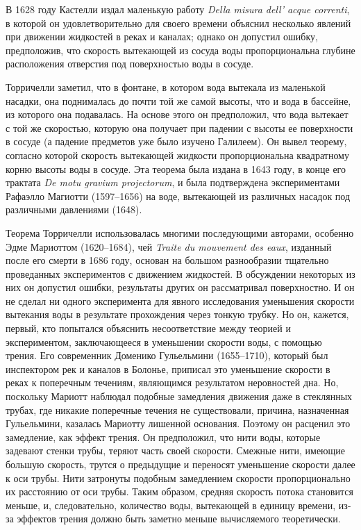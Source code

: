 В 1628 году Кастелли издал маленькую работу \textit{Della misura dell' acque correnti}, в которой он 
удовлетворительно для своего времени объяснил несколько явлений при движении жидкостей 
в реках и каналах; однако он допустил ошибку, предположив, что скорость вытекающей 
из сосуда воды пропорциональна глубине расположения отверстия под поверхностью воды в сосуде.

Торричелли заметил, что в фонтане, в котором вода вытекала из маленькой насадки, 
она поднималась до почти той же самой высоты, что и вода в бассейне, из которого она подавалась. 
На основе этого он предположил, что вода вытекает с той же скоростью, которую она получает 
при падении с высоты ее поверхности в сосуде (а падение предметов уже было изучено Галилеем). 
Он вывел теорему, согласно 
которой скорость вытекающей жидкости пропорциональна квадратному корню высоты воды в сосуде. 
Эта теорема была издана в 1643 году, в конце его трактата \textit{De motu gravium projectorum}, и была 
подтверждена экспериментами Рафаэлло Магиотти (1597--1656) на воде, вытекающей из различных 
насадок под различными давлениями (1648).

Теорема Торричелли использовалась многими последующими авторами, особенно 
Эдме Мариоттом (1620--1684), чей \textit{Traite du mouvement des eaux}, изданный после его смерти 
в 1686 году, основан на большом разнообразии тщательно проведанных экспериментов 
с движением жидкостей. В обсуждении некоторых из них он допустил ошибки, результаты 
других он рассматривал поверхностно. И он не сделал ни одного эксперимента для явного 
исследования уменьшения скорости вытекания воды в результате прохождения через тонкую трубку. 
Но он, кажется, первый, кто попытался объяснить несоответствие между теорией и экспериментом, 
заключающееся в уменьшении скорости воды, с помощью трения. Его современник Доменико 
Гульельмини (1655--1710), который был инспектором рек и каналов в Болонье, приписал 
это уменьшение скорости в реках к поперечным течениям, являющимся результатом неровностей дна. 
Но, поскольку Мариотт наблюдал подобные замедления движения даже в стеклянных трубах, 
где никакие поперечные течения не существовали, причина, назначенная Гульельмини, казалась 
Мариотту лишенной основания. Поэтому он расценил это замедление, как эффект трения. 
Он предположил, что нити воды, которые задевают стенки трубы, теряют часть своей скорости. 
Смежные нити, имеющие большую скорость, трутся о предыдущие и переносят уменьшение скорости 
далее к оси трубы. Нити затронуты подобным замедлением скорости пропорционально их 
расстоянию от оси трубы. Таким образом, средняя скорость потока становится меньше, и, 
следовательно, количество воды, вытекающей в единицу времени, из-за эффектов трения 
должно быть заметно меньше вычисляемого теоретически.

